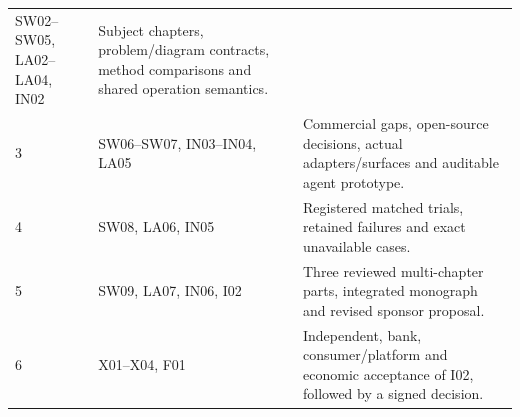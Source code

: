 \documentclass[
  11pt,
  a4paper,
]{article}
\begin{document}
\begin{longtable}[]{@{}lll@{}}
\begin{minipage}[t]{0.30\columnwidth}
SW02--SW05, LA02--LA04, IN02\strut
\end{minipage} & \begin{minipage}[t]{0.30\columnwidth}\raggedright
Subject chapters, problem/diagram contracts, method comparisons and
shared operation semantics.\strut
\end{minipage}\tabularnewline
\begin{minipage}[t]{0.30\columnwidth}\raggedright
3\strut
\end{minipage} & \begin{minipage}[t]{0.30\columnwidth}\raggedright
SW06--SW07, IN03--IN04, LA05\strut
\end{minipage} & \begin{minipage}[t]{0.30\columnwidth}\raggedright
Commercial gaps, open-source decisions, actual adapters/surfaces and
auditable agent prototype.\strut
\end{minipage}\tabularnewline
\begin{minipage}[t]{0.30\columnwidth}\raggedright
4\strut
\end{minipage} & \begin{minipage}[t]{0.30\columnwidth}\raggedright
SW08, LA06, IN05\strut
\end{minipage} & \begin{minipage}[t]{0.30\columnwidth}\raggedright
Registered matched trials, retained failures and exact unavailable
cases.\strut
\end{minipage}\tabularnewline
\begin{minipage}[t]{0.30\columnwidth}\raggedright
5\strut
\end{minipage} & \begin{minipage}[t]{0.30\columnwidth}\raggedright
SW09, LA07, IN06, I02\strut
\end{minipage} & \begin{minipage}[t]{0.30\columnwidth}\raggedright
Three reviewed multi-chapter parts, integrated monograph and revised
sponsor proposal.\strut
\end{minipage}\tabularnewline
\begin{minipage}[t]{0.30\columnwidth}\raggedright
6\strut
\end{minipage} & \begin{minipage}[t]{0.30\columnwidth}\raggedright
X01--X04, F01\strut
\end{minipage} & \begin{minipage}[t]{0.30\columnwidth}\raggedright
Independent, bank, consumer/platform and economic acceptance of I02,
followed by a signed decision.\strut
\end{minipage}\tabularnewline
\bottomrule
\end{longtable}
\end{document}
